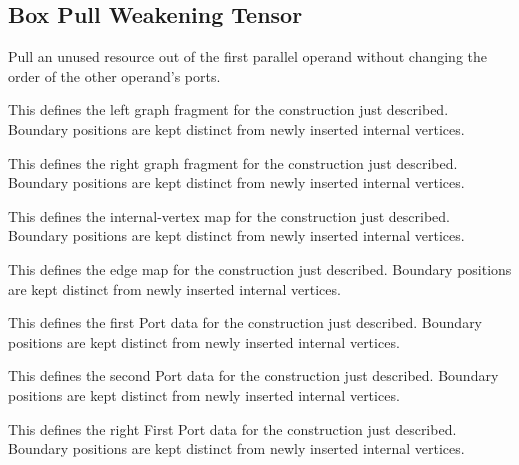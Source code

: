 \subsection{Box Pull Weakening Tensor}
Pull an unused resource out of the first parallel operand without changing the order of the other operand's ports.

This defines the left graph fragment for the construction just described. Boundary positions are kept distinct from newly inserted internal vertices.
\par{}

This defines the right graph fragment for the construction just described. Boundary positions are kept distinct from newly inserted internal vertices.
\par{}

This defines the internal-vertex map for the construction just described. Boundary positions are kept distinct from newly inserted internal vertices.
\par{}

This defines the edge map for the construction just described. Boundary positions are kept distinct from newly inserted internal vertices.
\par{}

This defines the first Port data for the construction just described. Boundary positions are kept distinct from newly inserted internal vertices.
\par{}

This defines the second Port data for the construction just described. Boundary positions are kept distinct from newly inserted internal vertices.
\par{}

This defines the right First Port data for the construction just described. Boundary positions are kept distinct from newly inserted internal vertices.
\par{}

